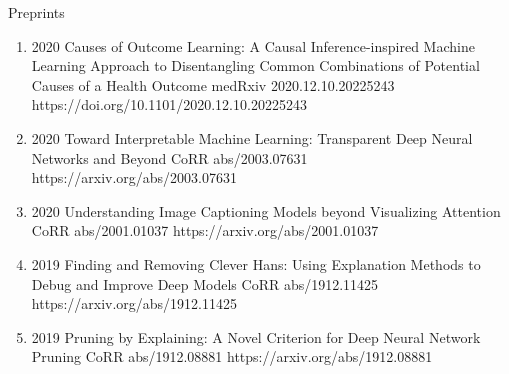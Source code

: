\documentclass[10pt,a4paper]{article} %
\begin{document}
\headedsection %
{Preprints}{}
{
    \begin{enumerate}

        \item[] 
                            {2020}
                            {Causes of Outcome Learning: A Causal Inference-inspired Machine Learning Approach to Disentangling Common Combinations of Potential Causes of a Health Outcome}
                            {medRxiv 2020.12.10.20225243}
                            {https://doi.org/10.1101/2020.12.10.20225243}

        \item[] 
                            {2020}
                            {Toward Interpretable Machine Learning: Transparent Deep Neural Networks and Beyond}
                            {CoRR abs/2003.07631}
                            {https://arxiv.org/abs/2003.07631}

        \item[] 
                            {2020}
                            {Understanding Image Captioning Models beyond Visualizing Attention}
                            {CoRR abs/2001.01037}
                            {https://arxiv.org/abs/2001.01037}

        \item[] 
                            {2019}
                            {Finding and Removing Clever Hans: Using Explanation Methods to Debug and Improve Deep Models}
                            {CoRR abs/1912.11425}
                            {https://arxiv.org/abs/1912.11425}

        \item[] 
                            {2019}
                            {Pruning by Explaining: A Novel Criterion for Deep Neural Network Pruning}
                            {CoRR abs/1912.08881}
                            {https://arxiv.org/abs/1912.08881}


\end{enumerate}}
\end{document}
